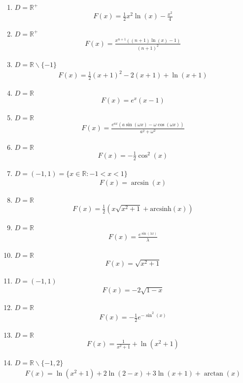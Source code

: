 \documentclass[11pt,answers]{exam}
\begin{document}
\begin{questions}
\begin{solution}
\begin{enumerate}
\item $D=\mathbb{R}^+$
\begin{align*}
F(x)=\frac{1}{2} x^2 \ln (x)-\frac{x^2}{4}
\end{align*}
\item $D=\mathbb{R}^+$
\begin{align*}
F(x)=\frac{x^{n+1} ((n+1) \ln (x)-1)}{(n+1)^2}
\end{align*}
\item $D=\mathbb{R}\backslash\{-1\}$
\begin{align*}
F(x)=\frac{1}{2} (x+1)^2-2 (x+1)+\ln (x+1)
\end{align*}
\item $D=\mathbb{R}$
\begin{align*}
F(x)=e^x (x-1)
\end{align*}
\item $D=\mathbb{R}$
\begin{align*}
F(x)=\frac{e^{a x} (a \sin (\omega x)-\omega  \cos (\omega x))}{a^2+\omega ^2}
\end{align*}
\item $D=\mathbb{R}$
\begin{align*}
F(x)=-\frac{1}{2} \cos ^2(x)
\end{align*}
\item $D=(-1,1)=\{x\in\mathbb{R}:-1<x<1\}$
\begin{align*}
F(x)=\arcsin(x)
\end{align*}
\item $D=\mathbb{R}$
\begin{align*}
F(x)=\frac{1}{2} \left(x\sqrt{x^2+1}+\text{arcsinh}(x)\right)
\end{align*}
\item $D=\mathbb{R}$
\begin{align*}
F(x)=\frac{e^{\sin (\lambda  x)}}{\lambda }
\end{align*}
\item $D=\mathbb{R}$
\begin{align*}
F(x)=\sqrt{x^2+1}
\end{align*}
\item $D=(-1,1)$
\begin{align*}
F(x)=-2 \sqrt{1-x}
\end{align*}
\item $D=\mathbb{R}$
\begin{align*}
F(x)=-\frac{1}{2} e^{-\sin ^2(x)}
\end{align*}
\item $D=\mathbb{R}$
\begin{align*}
F(x)=\frac{1}{x^2+1}+\ln \left(x^2+1\right)
\end{align*}
\item $D=\mathbb{R}\backslash\{-1,2\}$
\begin{align*}
F(x)=\ln \left(x^2+1\right)+2 \ln (2-x)+3 \ln (x+1)+\arctan(x)
\end{align*}
\end{enumerate}
\end{solution}



\end{questions}
\end{document}
